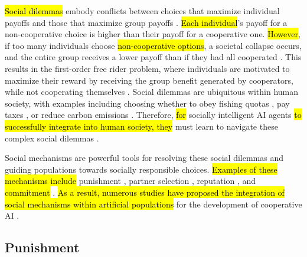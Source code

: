 \documentclass[sn-aps,numbered]{sn-jnl}%
\theoremstyle{thmstyleone}%
\theoremstyle{thmstyletwo}%
\theoremstyle{thmstylethree}%
\begin{document}
\hl{Social dilemmas} embody conflicts between choices that maximize individual payoffs and those that maximize group payoffs \citep{Henrich2006, evolution_of_cooperation}. \hl{Each individual}’s payoff for a non-cooperative choice is higher than their payoff for a cooperative one. \hl{However}, if too many individuals choose \hl{non-cooperative options}, a societal collapse occurs, and the entire group receives a lower payoff than if they had all cooperated \citep{social_dilemmas, social_dilemmas_kollock,manifesto_multi_agent}. This results in the first-order free rider problem, where individuals are motivated to maximize their reward by receiving the group benefit generated by cooperators, while not cooperating themselves \citep{social_dilemmas_kollock}. Social dilemmas are ubiquitous within human society, with examples including choosing whether to obey fishing quotas \citep{social_dilemmas_kollock}, pay taxes \citep{mirco_partner_selection}, or reduce carbon emissions \citep{social_dilemmas}. Therefore, \hl{for} socially intelligent AI agents \hl{to successfully integrate into human society, they} must learn to navigate these complex social dilemmas \citep{coop_ai_nature_comment}.

Social mechanisms are powerful tools for resolving these social dilemmas and guiding populations towards socially responsible choices. \hl{Examples of these mechanisms include} punishment \citep{division_of_labour, punishment_coop_commitment, metapunishing, silly_rules_ssd, boyd1992punishment}, partner selection \cite{mirco_partner_selection, partner_select_vs_punishment, reputation_based_partner_choice}, reputation \citep{schmid2021unified, reputation_honest_signalling, reputation_raihani, coop_reputation_mirco}, and \hl{commitment} \citep{synergy_punish_commit, synergy_intention_commitment, krellner2023words}. \hl{As a result, numerous studies have proposed the integration of social mechanisms within artificial populations} for the development of cooperative AI \citep{open_problems_coop_ai, mirco_partner_selection, coop_reputation_mirco, silly_rules_ssd, division_of_labour, parity_sympathy_reciprocity, metapunishing, resource_constraint_punish, synergy_punish_commit, schmid2021unified}.

\subsection{Punishment}
\end{document}
